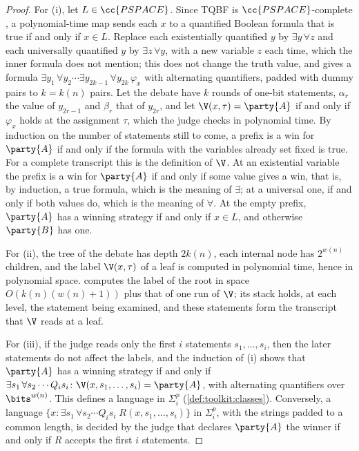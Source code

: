 \begin{refsection}
\begin{proof}
For (i), let $L\in\cc{PSPACE}$. Since TQBF is $\cc{PSPACE}$-complete \parencite{StockmeyerMeyer1973}, a polynomial-time map sends each $x$ to a quantified Boolean formula that is true if and only if $x\in L$. Replace each existentially quantified $y$ by $\exists y\,\forall z$ and each universally quantified $y$ by $\exists z\,\forall y$, with a new variable $z$ each time, which the inner formula does not mention; this does not change the truth value, and gives a formula $\exists y_1\,\forall y_2\cdots\exists y_{2k-1}\,\forall y_{2k}\,\varphi_x$ with alternating quantifiers, padded with dummy pairs to $k=k(n)$ pairs. Let the debate have $k$ rounds of one-bit statements, $\alpha_r$ the value of $y_{2r-1}$ and $\beta_r$ that of $y_{2r}$, and let $\V(x,\tau)=\party{A}$ if and only if $\varphi_x$ holds at the assignment $\tau$, which the judge checks in polynomial time. By induction on the number of statements still to come, a prefix is a win for $\party{A}$ if and only if the formula with the variables already set fixed is true. For a complete transcript this is the definition of $\V$. At an existential variable the prefix is a win for $\party{A}$ if and only if some value gives a win, that is, by induction, a true formula, which is the meaning of $\exists$; at a universal one, if and only if both values do, which is the meaning of $\forall$. At the empty prefix, $\party{A}$ has a winning strategy if and only if $x\in L$, and otherwise $\party{B}$ has one.

For (ii), the tree of the debate has depth $2k(n)$, each internal node has $2^{w(n)}$ children, and the label $\V(x,\tau)$ of a leaf is computed in polynomial time, hence in polynomial space.  computes the label of the root in space $O(k(n)(w(n)+1))$ plus that of one run of $\V$; its stack holds, at each level, the statement being examined, and these statements form the transcript that $\V$ reads at a leaf.

For (iii), if the judge reads only the first $i$ statements $s_1,\dots,s_i$, then the later statements do not affect the labels, and the induction of (i) shows that $\party{A}$ has a winning strategy if and only if $\exists s_1\,\forall s_2\cdots Q_is_i\colon\V(x,s_1,\dots,s_i)=\party{A}$, with alternating quantifiers over $\bits^{w(n)}$. This defines a language in $\Sigma_i^p$ (\cref{def:toolkit:classes}). Conversely, a language $\{x:\exists s_1\,\forall s_2\cdots Q_is_i\;R(x,s_1,\dots,s_i)\}$ in $\Sigma_i^p$, with the strings padded to a common length, is decided by the judge that declares $\party{A}$ the winner if and only if $R$ accepts the first $i$ statements.
\end{proof}


\end{refsection}
